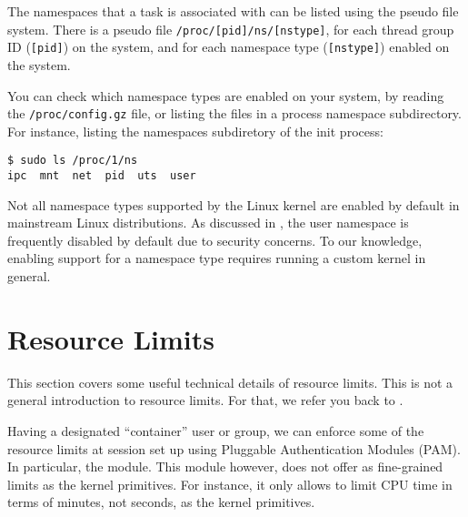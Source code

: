 The namespaces that a task is associated with can be listed using the
\cite{man-5-proc} pseudo file system. There is a pseudo file
\texttt{/proc/[pid]/ns/[nstype]}, for each thread group ID (\texttt{[pid]}) on
the system, and for each namespace type (\texttt{[nstype]}) enabled on the
system.

You can check which namespace types are enabled on your system, by reading the
\texttt{/proc/config.gz} file, or listing the files in a process namespace
subdirectory. For instance, listing the namespaces subdiretory of the init
process:

\begin{lstlisting}
$ sudo ls /proc/1/ns
ipc  mnt  net  pid  uts  user
\end{lstlisting}

Not all namespace types supported by the Linux kernel are enabled by default in
mainstream Linux distributions. As discussed in
, the user namespace is frequently
disabled by default due to security concerns. To our knowledge, enabling
support for a namespace type requires running a custom kernel in general.

\section{Resource Limits}

\label{appendix:resource-limits}

This section covers some useful technical details of resource limits. This is
not a general introduction to resource limits. For that, we refer you back to
.

Having a designated ``container'' user or group, we can enforce some of the
resource limits at session set up using Pluggable Authentication Modules (PAM).
In particular, the \cite{pam-limits} module. This module however, does not
offer as fine-grained limits as the kernel primitives. For instance, it only allows
to limit CPU time in terms of minutes, not seconds, as the kernel primitives.
